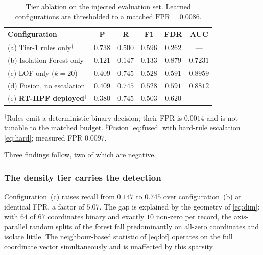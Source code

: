 \documentclass[conference]{IEEEtran}
\begin{document}
\begin{table}[t]
\centering
\caption{Tier ablation on the injected evaluation set. Learned
configurations are thresholded to a matched $\mathrm{FPR}=0.0086$.}
\label{tab:ablation}
\renewcommand{\arraystretch}{1.25}
\footnotesize
\setlength{\tabcolsep}{4pt}
\begin{tabular}{@{}lccccc@{}}
\toprule
\textbf{Configuration} & \textbf{P} & \textbf{R} & \textbf{F1} & \textbf{FDR} & \textbf{AUC} \\
\midrule
(a) Tier-1 rules only$^{\dagger}$          & $0.738$ & $0.500$ & $0.596$ & $0.262$ & --- \\
(b) Isolation Forest only                  & $0.121$ & $0.147$ & $0.133$ & $0.879$ & $0.7231$ \\
(c) LOF only ($k=20$)                      & $0.409$ & $0.745$ & $0.528$ & $0.591$ & $0.8959$ \\
(d) Fusion, no escalation                  & $0.409$ & $0.745$ & $0.528$ & $0.591$ & $0.8812$ \\
\midrule
(e) \textbf{RT-IIPF deployed}$^{\ddagger}$ & $0.380$ & $0.745$ & $0.503$ & $0.620$ & --- \\
\bottomrule
\end{tabular}

\vspace{2pt}
{\footnotesize\raggedright
$^{\dagger}$Rules emit a deterministic binary decision; their FPR is
$0.0014$ and is not tunable to the matched budget.
$^{\ddagger}$Fusion \eqref{eq:fused} with hard-rule escalation
\eqref{eq:hard}; measured FPR $0.0097$.\par}
\end{table}

Three findings follow, two of which are negative.

\subsubsection{The density tier carries the detection}
Configuration~(c) raises recall from $0.147$ to $0.745$ over
configuration~(b) at identical FPR, a factor of $5.07$. The gap is
explained by the geometry of \eqref{eq:dim}: with $64$ of $67$
coordinates binary and exactly $10$ non-zero per record, the
axis-parallel random splits of the forest fall predominantly on
all-zero coordinates and isolate little. The neighbour-based statistic
of \eqref{eq:lof} operates on the full coordinate vector
simultaneously and is unaffected by this sparsity.
\end{document}
